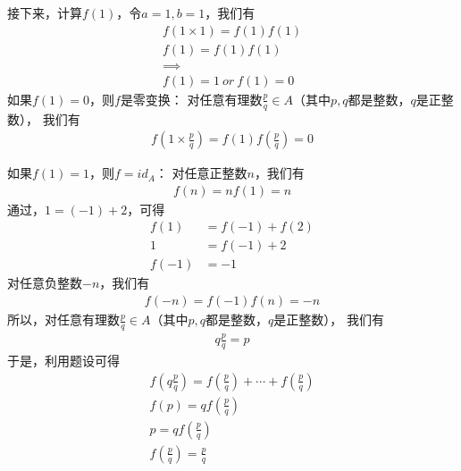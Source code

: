 \documentclass{article}
\begin{document}
\begin{itemize}
            接下来，计算$f(1)$，令$a = 1, b = 1$，我们有
            \begin{align*}
                  f(1 \times 1) = f(1) f(1) \\
                  f(1) = f(1) f(1)          \\
                  \implies                  \\
                  f(1) = 1 \ or \ f(1) = 0
            \end{align*}
            如果$f(1) = 0$，则$f$是零变换：
            对任意有理数$\frac{p}{q} \in A$（其中$p, q$都是整数，$q$是正整数），
            我们有
            \begin{align*}
                  f(1 \times \frac{p}{q}) = f(1)  f(\frac{p}{q}) = 0
            \end{align*}

            如果$f(1) = 1$，则$f = id_A$：
            对任意正整数$n$，我们有
            \begin{align*}
                  f(n) = n f(1) = n
            \end{align*}
            通过，$1 = (-1) + 2$，可得
            \begin{align*}
                  f(1)  & = f(-1) + f(2) \\
                  1     & = f(-1) + 2    \\
                  f(-1) & = -1
            \end{align*}
            对任意负整数$-n$，我们有
            \begin{align*}
                  f(-n) = f(-1) f(n) = -n
            \end{align*}
            所以，对任意有理数$\frac{p}{q} \in A$（其中$p, q$都是整数，$q$是正整数），
            我们有
            \begin{align*}
                  q \frac{p}{q} = p
            \end{align*}
            于是，利用题设可得
            \begin{align*}
                  f(q \frac{p}{q}) = f(\frac{p}{q}) + \cdots + f(\frac{p}{q}) \\
                  f(p) = q f(\frac{p}{q})                                     \\
                  p = q f(\frac{p}{q})                                        \\
                  f(\frac{p}{q}) = \frac{p}{q}
            \end{align*}
\end{itemize}
\end{document}
